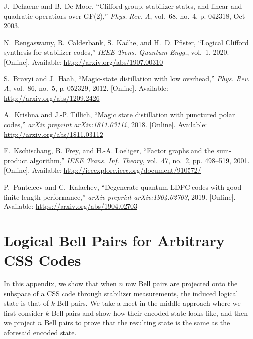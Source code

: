 \documentclass[journal,onecolumn]{IEEEtran}
\begin{document}
\begin{thebibliography}{10}
J.~Dehaene and B.~{De Moor}, ``{Clifford group, stabilizer states, and linear
  and quadratic operations over GF(2)},'' \emph{Phys. Rev. A}, vol.~68, no.~4,
  p. 042318, Oct 2003.

\BIBentryALTinterwordspacing
N.~Rengaswamy, R.~Calderbank, S.~Kadhe, and H.~D. Pfister, ``Logical {C}lifford
  synthesis for stabilizer codes,'' \emph{IEEE Trans. Quantum Engg.}, vol.~1,
  2020. [Online]. Available: \url{http://arxiv.org/abs/1907.00310}
\BIBentrySTDinterwordspacing

\BIBentryALTinterwordspacing
S.~Bravyi and J.~Haah, ``{Magic-state distillation with low overhead},''
  \emph{Phys. Rev. A}, vol.~86, no.~5, p. 052329, 2012. [Online]. Available:
  \url{http://arxiv.org/abs/1209.2426}
\BIBentrySTDinterwordspacing

\BIBentryALTinterwordspacing
A.~Krishna and J.-P. Tillich, ``Magic state distillation with punctured polar
  codes,'' \emph{arXiv preprint arXiv:1811.03112}, 2018. [Online]. Available:
  \url{http://arxiv.org/abs/1811.03112}
\BIBentrySTDinterwordspacing

\BIBentryALTinterwordspacing
F.~Kschischang, B.~Frey, and H.-A. Loeliger, ``Factor graphs and the
  sum-product algorithm,'' \emph{IEEE Trans. Inf. Theory}, vol.~47, no.~2, pp.
  498--519, 2001. [Online]. Available:
  \url{http://ieeexplore.ieee.org/document/910572/}
\BIBentrySTDinterwordspacing

\BIBentryALTinterwordspacing
P.~Panteleev and G.~Kalachev, ``Degenerate quantum {LDPC} codes with good
  finite length performance,'' \emph{arXiv preprint arXiv:1904.02703}, 2019.
  [Online]. Available: \url{https://arxiv.org/abs/1904.02703}
\BIBentrySTDinterwordspacing

\end{thebibliography}



\appendices

\section{Logical Bell Pairs for Arbitrary CSS Codes}
\label{sec:logical_bell_CSS}


In this appendix, we show that when $n$ raw Bell pairs are projected onto the subspace of a CSS code through stabilizer measurements, the induced logical state is that of $k$ Bell pairs.
We take a meet-in-the-middle approach where we first consider $k$ Bell pairs and show how their encoded state looks like, and then we project $n$ Bell pairs to prove that the resulting state is the same as the aforesaid encoded state.
\end{document}
